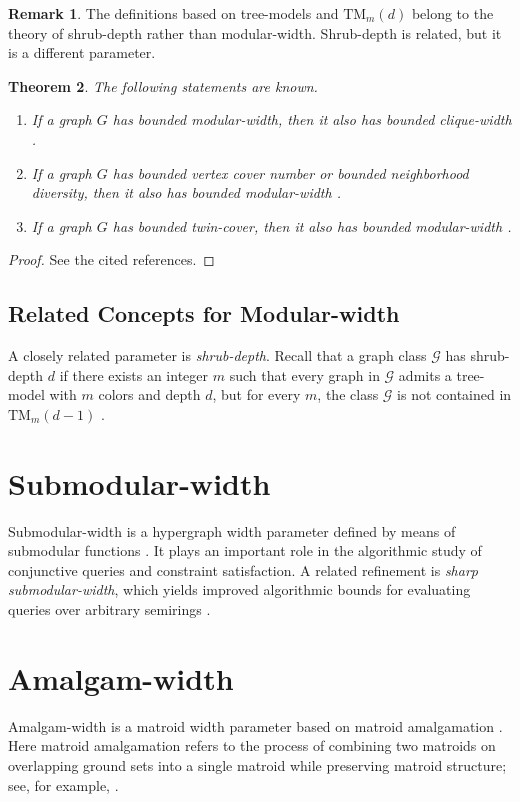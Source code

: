 \documentclass[10pt]{book}
\newtheorem{theorem}{Theorem}[section]
\theoremstyle{definition}
\newtheorem{remark}[theorem]{Remark}
\begin{document}
\begin{remark}
The definitions based on tree-models and \(\mathrm{TM}_m(d)\) belong to the theory of shrub-depth rather than modular-width.  
Shrub-depth is related, but it is a different parameter.
\end{remark}

\begin{theorem}
The following statements are known.
\begin{enumerate}
    \item If a graph \(G\) has bounded modular-width, then it also has bounded clique-width \cite{343}.

    \item If a graph \(G\) has bounded vertex cover number or bounded neighborhood diversity, then it also has bounded modular-width \cite{343}.

    \item If a graph \(G\) has bounded twin-cover, then it also has bounded modular-width \cite{343}.
\end{enumerate}
\end{theorem}

\begin{proof}
See the cited references.
\end{proof}

\subsection{Related Concepts for Modular-width}
A closely related parameter is \emph{shrub-depth}.  
Recall that a graph class \(\mathcal{G}\) has shrub-depth \(d\) if there exists an integer \(m\) such that every graph in \(\mathcal{G}\) admits a tree-model with \(m\) colors and depth \(d\), but for every \(m\), the class \(\mathcal{G}\) is not contained in \(\mathrm{TM}_m(d-1)\) \cite{42}.

\section{Submodular-width}
Submodular-width is a hypergraph width parameter defined by means of submodular functions \cite{43}.  
It plays an important role in the algorithmic study of conjunctive queries and constraint satisfaction.  
A related refinement is \emph{sharp submodular-width}, which yields improved algorithmic bounds for evaluating queries over arbitrary semirings \cite{khamis2020functional}.

\section{Amalgam-width}
Amalgam-width is a matroid width parameter based on matroid amalgamation \cite{30}.  
Here matroid amalgamation refers to the process of combining two matroids on overlapping ground sets into a single matroid while preserving matroid structure; see, for example, \cite{Poljak1984AmalgamationOU,Nesetril1981AmalgamationOM}.
\end{document}
